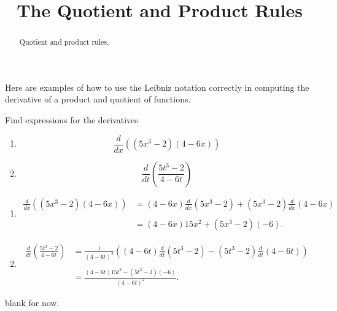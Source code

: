 \documentclass{ximera}
\title{The Quotient and Product Rules}
\begin{document}
\begin{abstract}
Quotient and product rules.
\end{abstract}
\maketitle

Here are examples of how to use the Leibniz notation correctly in computing the derivative of a product and quotient of functions.

\begin{example} \label{Edfhnhhthgg}

Find expressions for the derivatives

\begin{enumerate}

\item 
\[
   \frac{d}{dx} \left( (5x^3-2)(4 - 6x)  \right)
\]

\item 
\[
  \frac{d}{dt} \left( \frac{5t^3-2}{4 - 6t}  \right)
\]
\end{enumerate}

\begin{explanation}
\begin{enumerate}

\item 
\begin{align*}
\frac{d}{dx} \left( (5x^3-2)(4 - 6x)  \right)  &= (4-6x)\frac{d}{dx} \left( 5x^3-2 \right) + (5x^3-2)   \frac{d}{dx} \left( 4-6x \right)    \\ \\
              &= (4-6x) 15x^2+ (5x^3-2) (-6) .
\end{align*}

\item 

\begin{align*}
\frac{d}{dt} \left( \frac{5t^3-2}{4 - 6t}  \right)  &=\frac{1}{(4-6t)^2} \left( (4-6t) \frac{d}{dt} \left( 5t^3-2 \right)  - (5t^3-2)   \frac{d}{dt} \left( 4-6t \right)   \right)  \\ \\
              &= \frac{(4-6t) 15t^2 - (5t^3-2) (-6)}{(4-6t)^2} .
\end{align*}


\end{enumerate}

\end{explanation}

\begin{question}  \label{Qdfbv4trttg}
blank for now.
\end{question}




\end{example}
\end{document}
